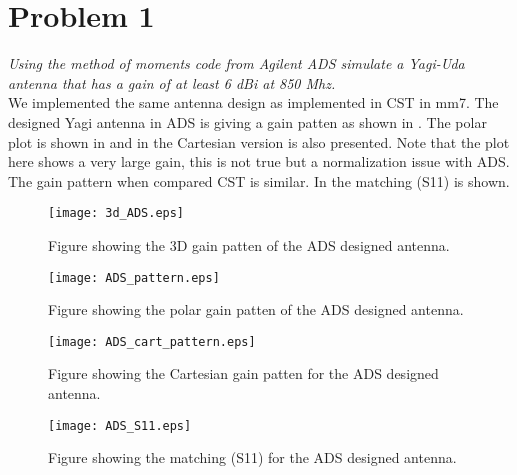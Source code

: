 \section{Problem 1}
\textit{ Using the method of moments code from Agilent ADS simulate a Yagi-Uda antenna that has a gain of at least 6 dBi at 850 Mhz.}\\

We implemented the same antenna design as implemented in CST in mm7. The designed Yagi antenna in ADS is giving a gain patten as shown in . The polar plot is shown in  and in  the Cartesian version is also presented. Note that the plot here shows a very large gain, this is not true but a normalization issue with ADS. The gain pattern when compared CST is similar. In  the matching (S11) is shown. 

\begin{figure}[!h]
  \centering
  \texttt{[image: 3d\_ADS.eps]}
  \caption{Figure showing the 3D gain patten of the ADS designed antenna.}
  \label{fig:3d_ADS}
\end{figure}

\begin{figure}[!h]
  \centering
  \texttt{[image: ADS\_pattern.eps]}
  \caption{Figure showing the polar gain patten of the ADS designed antenna.}
  \label{fig:ADS_pattern}
\end{figure}

\begin{figure}[!h]
  \centering
  \texttt{[image: ADS\_cart\_pattern.eps]}
  \caption{Figure showing the Cartesian gain patten for the ADS designed antenna.}
  \label{fig:ADS_cart_pattern}
\end{figure}

\begin{figure}[!h]
  \centering
  \texttt{[image: ADS\_S11.eps]}
  \caption{Figure showing the matching (S11) for the ADS designed antenna.}
  \label{fig:ADS_S11}
\end{figure}

